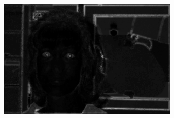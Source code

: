 \begin{figure}[H]
\begin{subfigure}{.33\textwidth}
  \centering
  \includegraphics[width=0.95\textwidth]{img/fd/OriginalEyeMap.png}
  \caption{}
\end{subfigure}%


\end{figure}
